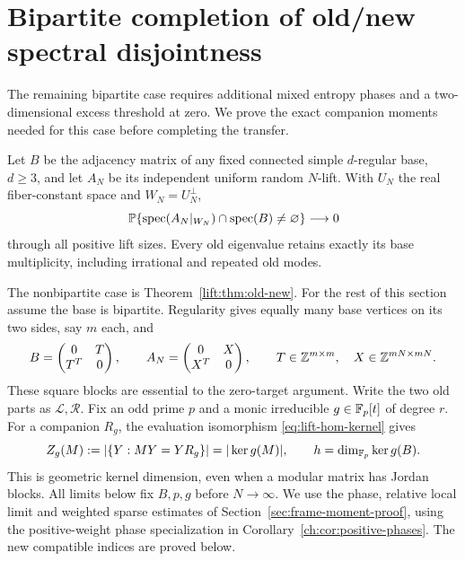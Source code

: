 \section{Bipartite completion of old/new spectral disjointness}
\label{sec:bipartite-spectral}
The remaining bipartite case requires additional mixed entropy phases
and a two-dimensional excess threshold at zero. We prove the exact
companion moments needed for this case before completing the transfer.

\begin{theorem}\label{lift:thm:all-base}
Let $B$ be the adjacency matrix of any fixed connected simple
$d$-regular base, $d\ge3$, and let $A_N$ be its independent uniform
random $N$-lift. With $U_N$ the real fiber-constant space and
$W_N=U_N^\perp$,
\[
 \mathbb P\{\operatorname{spec}(A_N|_{W_N})\cap\operatorname{spec}(B)\ne\varnothing\}
 \longrightarrow0
\]
through all positive lift sizes. Every old eigenvalue retains exactly
its base multiplicity, including irrational and repeated old modes.
\end{theorem}

The nonbipartite case is Theorem~\ref{lift:thm:old-new}.
For the rest of this section assume the base is bipartite. Regularity
gives equally many base vertices on its two sides, say $m$ each, and
\begin{equation}\label{eq:bip-square-blocks}
 B=\begin{pmatrix}0&T\\T^T&0\end{pmatrix},\qquad
 A_N=\begin{pmatrix}0&X\\X^T&0\end{pmatrix},
 \qquad T\in\mathbb Z^{m\times m},\quad X\in\mathbb Z^{mN\times mN}.
\end{equation}
These square blocks are essential to the zero-target argument.
Write the two old parts as $\mathcal L,\mathcal R$.
Fix an odd prime $p$ and a monic irreducible $g\in\mathbb F_p[t]$ of
degree $r$. For a companion $R_g$, the evaluation isomorphism
\eqref{eq:lift-hom-kernel} gives
\[
 Z_g(M):=|\{Y:MY=YR_g\}|=|\ker g(M)|,
 \qquad h=\dim_{\mathbb F_p}\ker g(B).
\]
This is geometric kernel dimension, even when a modular matrix has
Jordan blocks. All limits below fix $B,p,g$ before $N\to\infty$.
We use the phase, relative local limit and weighted sparse estimates
of Section~\ref{sec:frame-moment-proof}, using the positive-weight
phase specialization in Corollary~\ref{ch:cor:positive-phases}. The new compatible indices are proved below.

